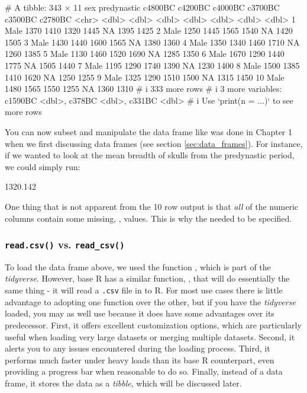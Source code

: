 \begin{outR}
# A tibble: 343 × 11
   sex   predynastic c4800BC c4200BC c4000BC c3700BC c3500BC c2780BC
   <chr>       <dbl>   <dbl>   <dbl>   <dbl>   <dbl>   <dbl>   <dbl>
 1 Male         1370    1410    1320    1445      NA    1395    1425
 2 Male         1250    1445    1565    1540      NA    1420    1505
 3 Male         1430    1440    1600    1565      NA    1380    1360
 4 Male         1350    1340    1460    1710      NA    1260    1385
 5 Male         1130    1460    1520    1690      NA    1285    1350
 6 Male         1670    1290    1440    1775      NA    1505    1440
 7 Male         1195    1290    1740    1390      NA    1230    1400
 8 Male         1500    1385    1410    1620      NA    1250    1255
 9 Male         1325    1290    1510    1500      NA    1315    1450
10 Male         1480    1565    1550    1255      NA    1360    1310
# i 333 more rows
# i 3 more variables: c1590BC <dbl>, c378BC <dbl>, c331BC <dbl>
# i Use `print(n = ...)` to see more rows
\end{outR}

You can now subset and manipulate the data frame  like was done in Chapter 1 when we first discussing data frames (see section \ref{sec:data_frames}). For instance, if we wanted to look at the mean breadth of skulls from the predynastic period, we could simply run:

\begin{outR}
[1] 1320.142
\end{outR}

\noindent
One thing that is not apparent from the 10 row output is that \textit{all} of the numeric columns contain some missing, , values. This is why the  needed to be specified.

\subsubsection{\texttt{read.csv()} vs. \texttt{read\_csv()}}

To load the  data frame above, we used the function , which is part of the \textit{tidyverse}. However, base R has a similar function, , that will do essentially the same thing - it will read a \texttt{.csv} file in to R. For most use cases there is little advantage to adopting one function over the other, but if you have the \textit{tidyverse} loaded, you may as well use  because it does have some advantages over its predecessor. First, it offers excellent customization options, which are particularly useful when loading very large datasets or merging multiple datasets. Second, it alerts you to any issues encountered during the loading process. Third, it performs much faster under heavy loads than its base R counterpart, even providing a progress bar when reasonable to do so. Finally, instead of a data frame, it stores the data as a \textit{tibble}, which will be discussed later.

